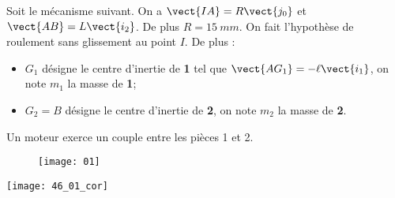 \normalfalse \difficiletrue \tdifficilefalse
\correctiontrue


\setcounter{question}{0}%
\ifcorrection
\else
{}
\fi

\ifprof
\else
Soit le mécanisme suivant. On a $\vect{IA}=R\vect{j_0}$ et $\vect{AB}=L\vect{i_2}$. De plus $R=\SI{15}{mm}$.
On fait l'hypothèse de roulement sans glissement au point $I$. De plus :
\begin{itemize}
\item $G_1$ désigne le centre d'inertie de \textbf{1} tel que $\vect{AG_1}=-\ell\vect{i_1}$, on note $m_1$ la masse de \textbf{1};%
\item $G_2=B$ désigne le centre d'inertie de \textbf{2}, on note $m_2$ la masse de \textbf{2}.%
\end{itemize}
Un moteur exerce un couple entre les pièces 1 et 2. 
\begin{figure}[!h]
\texttt{[image: 01]}
\end{figure}
\fi

\ifprof
\begin{marginfigure}
\texttt{[image: 46\_01\_cor]}
\end{marginfigure}

\else
\fi

\ifprof


